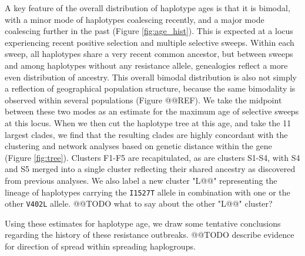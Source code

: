 \documentclass[a4paper,11pt,abstracton]{scrartcl}
\begin{document}
%
A key feature of the overall distribution of haplotype ages is that it is bimodal, with a minor mode of haplotypes coalescing recently, and a major mode coalescing further in the past (Figure \ref{fig:age_hist}).
%
This is expected at a locus experiencing recent positive selection and multiple selective sweeps.
%
Within each sweep, all haplotypes share a very recent common ancestor, but between sweeps and among haplotypes without any resistance allele, genealogies reflect a more even distribution of ancestry.
%
This overall bimodal distribution is also not simply a reflection of geographical population structure, because the same bimodality is observed within several populations (Figure @@REF). 
%
We take the midpoint between these two modes as an estimate for the maximum age of selective sweeps at this locus.
%
When we then cut the haplotype tree at this age, and take the 11 largest clades, we find that the resulting clades are highly concordant with the clustering and network analyses based on genetic distance within the gene (Figure \ref{fig:tree}).
%
Clusters F1-F5 are recapitulated, as are clusters S1-S4, with S4 and S5 merged into a single cluster reflecting their shared ancestry as discovered from previous analyses.
%
We also label a new cluster "L@@" representing the lineage of haplotypes carrying the \texttt{I1527T} allele in combination with one or the other \texttt{V402L} allele.
%
@@TODO what to say about the other "L@@" cluster?


%
Using these estimates for haplotype age, we draw some tentative conclusions regarding the history of these resistance outbreaks.
%
@@TODO describe evidence for direction of spread within spreading haplogroups.
%
\end{document}
